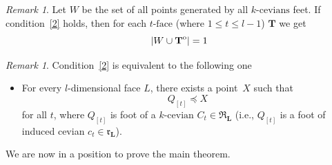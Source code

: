 \documentclass[12pt, reqno]{amsart}
\theoremstyle{definition}
\theoremstyle{remark}
\newtheorem{remark}[theorem]{Remark}
\numberwithin{equation}{section}
\newcommand{\interior}[1]{%
  {\kern0pt#1}^{\mathrm{o}}%
}
\begin{document}
{%



\begin{remark}\label{important}
 Let $W$ be the set of all points generated by all $k\mbox{-cevians}$ feet. If condition~\eqref{2} holds, then for each $t\mbox{-face}$ (where $1\leq t\leq l-1$) $\mathbf{T}$ we get
 \[
    |W\cup \interior{\mathbf{T}}|=1
 \]
\end{remark}

\begin{remark}\label{important2}
  Condition~\eqref{2} is equivalent to the following one
\begin{itemize}
\item For every $l$-dimensional face $L$, there exists a point~$X$ such that $$Q_{[t]}\preceq X$$ for all $t$, where $Q_{[t]}$ is foot of a $k\mbox{-cevian}$ $C_t\in \mathfrak{R}_\mathbf{L}$ (i.e., $Q_{[t]}$ is a foot of induced cevian $c_t\in \mathfrak{r}_\mathbf{L}$).
\end{itemize}
\end{remark}

We are now in a position to prove the main theorem.

}
\end{document}
